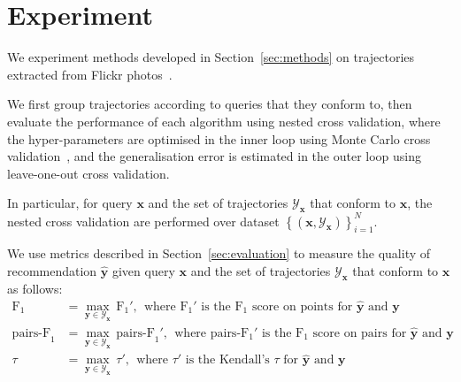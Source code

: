 \section{Experiment}
\label{sec:experiment}

We experiment methods developed in Section~\ref{sec:methods} on trajectories extracted from Flickr photos~\cite{thomee2016yfcc100m}.

We first group trajectories according to queries that they conform to,
then evaluate the performance of each algorithm using nested cross validation,
where the hyper-parameters are optimised in the inner loop using Monte Carlo cross validation~\cite{burman1989comparative},
and the generalisation error is estimated in the outer loop using leave-one-out cross validation.

In particular, for query $\mathbf{x}$ and the set of trajectories $\mathcal{Y}_\mathbf{x}$ that conform to $\mathbf{x}$,
the nested cross validation are performed over dataset $\left\{(\mathbf{x}, \mathcal{Y}_\mathbf{x})\right\}_{i=1}^N$.

We use metrics described in Section~\ref{sec:evaluation} to measure the quality of recommendation $\hat{\mathbf{y}}$ given
query $\mathbf{x}$ and the set of trajectories $\mathcal{Y}_\mathbf{x}$ that conform to $\mathbf{x}$ as follows:
\begin{align*}
\text{F}_1 &= \max_{\mathbf{y} \in \mathcal{Y}_\mathbf{x}} \, \text{F}_1', ~~
\text{where F$_1'$ is the F$_1$ score on points for $\hat{\mathbf{y}}$ and $\mathbf{y}$} \\
\text{pairs-F}_1 &= \max_{\mathbf{y} \in \mathcal{Y}_\mathbf{x}} \, \text{pairs-F}_1', ~~
\text{where pairs-F$_1'$ is the F$_1$ score on pairs for $\hat{\mathbf{y}}$ and $\mathbf{y}$} \\
\tau &= \max_{\mathbf{y} \in \mathcal{Y}_\mathbf{x}} \, \tau', ~~
\text{where $\tau'$ is the Kendall's $\tau$ for $\hat{\mathbf{y}}$ and $\mathbf{y}$}
\end{align*}

